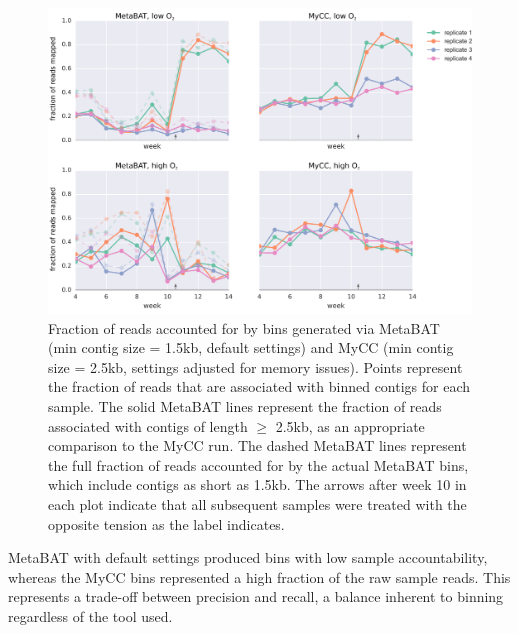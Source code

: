 \begin{figure}[H]
\centering
    \includegraphics[width=1.0\textwidth]{./tex/chapter2/figures/170201_comparable_read_coverage_for_metabat_and_mycc_3kb--INKSCAPED.pdf}
    \begin{singlespace}
    \caption[Fraction of reads accounted for by MetaBAT and MyCC bins]{
        Fraction of reads accounted for by bins generated via MetaBAT (min contig size = 1.5kb, default settings) and MyCC (min contig size = 2.5kb, settings adjusted for memory issues).
        Points represent the fraction of reads that are associated with binned contigs for each sample.
        The solid MetaBAT lines represent the fraction of reads associated with contigs of length $\geq$ 2.5kb, as an appropriate comparison to the MyCC run.
        The dashed MetaBAT lines represent the full fraction of reads accounted for by the actual MetaBAT bins, which include contigs as short as 1.5kb.
        The arrows after week 10 in each plot indicate that all subsequent samples were treated with the opposite  tension as the label indicates.
    }
    \label{fig:binning_frac_reads_mapped}
    \end{singlespace}
\end{figure}

MetaBAT with default settings produced bins with low sample accountability, whereas the MyCC bins represented a high fraction of the raw sample reads.
This represents a trade-off between precision and recall, a balance inherent to binning regardless of the tool used.

